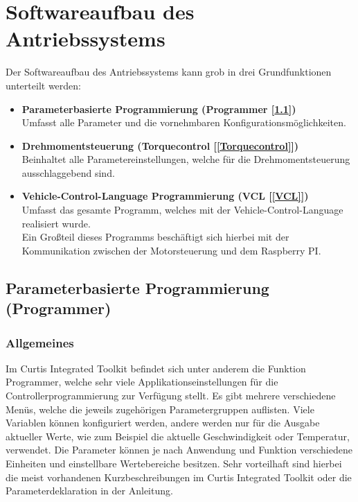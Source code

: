 \section{Softwareaufbau des Antriebssystems}
Der Softwareaufbau des Antriebssystems kann grob in drei Grundfunktionen unterteilt werden:
\\[5mm]
\begin{itemize}
	\item \textbf{Parameterbasierte Programmierung (Programmer [\ref{Programmer}])}
	\\[1mm] Umfasst alle Parameter und die vornehmbaren Konfigurationsmöglichkeiten.
	\medskip
	\item \textbf{Drehmomentsteuerung (Torquecontrol [\ref{Torquecontrol}])}
	\\[1mm] Beinhaltet alle Parametereinstellungen, welche für die Drehmomentsteuerung ausschlaggebend sind.
	\medskip
	\item \textbf{Vehicle-Control-Language Programmierung (VCL [\ref{VCL}])}
	\\[1mm] Umfasst das gesamte Programm, welches mit der Vehicle-Control-Language realisiert wurde.
	\\ Ein Großteil dieses Programms beschäftigt sich hierbei mit der Kommunikation zwischen der Motorsteuerung und dem Raspberry PI.
\end{itemize}

\newpage

\subsection{Parameterbasierte Programmierung (Programmer)}
\label{Programmer}
\subsubsection{Allgemeines}
Im Curtis Integrated Toolkit befindet sich unter anderem die Funktion \glqq Programmer\grqq{}, welche sehr viele Applikationseinstellungen für die Controllerprogrammierung zur Verfügung stellt. Es gibt mehrere verschiedene Menüs, welche die jeweils zugehörigen Parametergruppen auflisten. Viele Variablen können konfiguriert werden, andere werden nur für die Ausgabe aktueller Werte, wie zum Beispiel die aktuelle Geschwindigkeit oder Temperatur, verwendet. Die Parameter können je nach Anwendung und Funktion verschiedene Einheiten und einstellbare Wertebereiche besitzen. Sehr vorteilhaft sind hierbei die meist vorhandenen Kurzbeschreibungen im Curtis Integrated Toolkit oder die Parameterdeklaration in der Anleitung.
\\[5mm]

